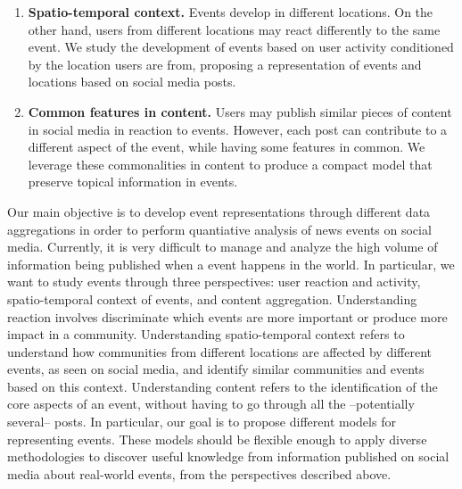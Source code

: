 \begin{intro}
\begin{enumerate}
    \item {\bf Spatio-temporal context.} 
    Events develop in different locations. 
    On the other hand, users from different locations may react differently to
    the same event.
    We study the development of events based on user activity conditioned by the
    location users are from, proposing a representation of events and locations
    based on social media posts.

    \item {\bf Common features in content.} 
    Users may publish similar pieces of content in social media in reaction to
    events.
    However, each post can contribute to a different aspect of the event, while
    having some features in common.
    We leverage these commonalities in content to produce a compact model that
    preserve topical information in events.
    
\end{enumerate}



Our main objective is to develop event representations through different data
aggregations in order to perform quantiative analysis of news events on social
media.
%
Currently, it is very difficult to manage and analyze the high volume of
information being published when a event happens in the world. 
%
In particular, we want to study events through three perspectives: user reaction
and activity, spatio-temporal context of events, and content aggregation.
%
Understanding reaction involves discriminate which events are more important or
produce more impact in a community. 
%
Understanding spatio-temporal context refers to understand how communities from
different locations are affected by different events, as seen on social media,
and identify similar communities and events based on this context. 
%
Understanding content refers to the identification of the core aspects of an
event, without having to go through all the –potentially several– posts.
%
In particular, our goal is to propose different models for representing events. 
%
These models should be flexible enough to apply diverse methodologies to
discover useful knowledge from information published on social media about
real-world events, from the perspectives described above. 





\end{intro}
